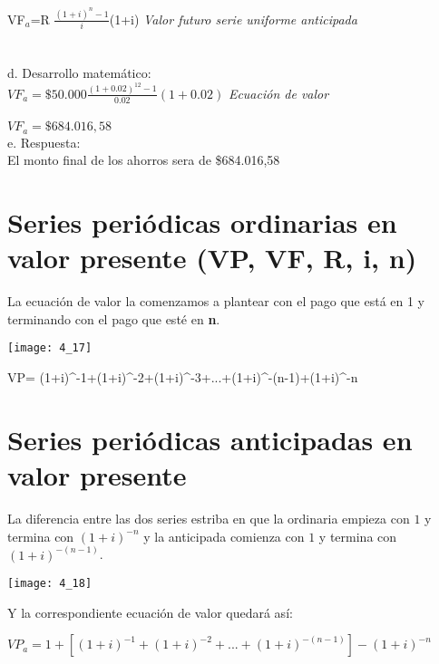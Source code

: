 {	VF$_{a}$=R $\frac{(1+i)^{n}-1}{i}$(1+i)  \hspace{35}\textit{Valor futuro serie  uniforme anticipada}\\
\\\\
d. Desarrollo matemático:\\


	$VF_{a}=\$50.000 \frac{(1+0.02)^{12}-1}{0.02}(1+0.02)$ \hspace{35}\textit{Ecuación de valor}
	\\\\
	$VF_{a}=\$684.016,58$ \\
	
e. Respuesta:\\

El monto final de los ahorros sera de \$684.016,58 \\

\section{Series periódicas ordinarias en valor presente (VP, VF, R, i, n)}
La ecuación de valor la comenzamos a plantear con el pago que está en 1 y terminando con el pago que esté en \textbf{n}.

\begin{center}
	\texttt{[image: 4\_17]}
\end{center}


	VP= (1+i)^{-1}+(1+i)^{-2}+(1+i)^{-3}+...+(1+i)^{-(n-1)}+(1+i)^{-n}

\clearpage

\section{Series periódicas anticipadas en valor presente}

La diferencia entre las dos series estriba en que la ordinaria empieza con $1$ y termina con $(1+i)^{-n}$ y la anticipada comienza con $1$ y termina con $(1+i)^{-(n-1)}$.

\begin{center}
	\texttt{[image: 4\_18]}
\end{center}

Y la correspondiente ecuación de valor quedará así:\\
\begin{center} 

	$VP_{a}=1+[(1+i)^{-1}+(1+i)^{-2}+...+(1+i)^{-(n-1)} ] -(1+i)^{-n}$
	

\end{center}}
